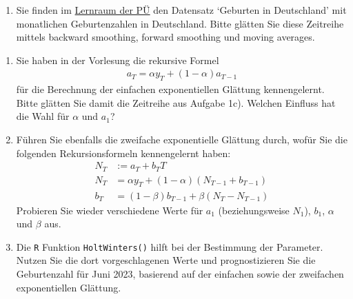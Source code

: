 \begin{enumerate}
\item Sie finden im \href{https://moodle.uni-bielefeld.de/course/view.php?id=1035}{Lernraum der PÜ} den Datensatz `Geburten in Deutschland' mit monatlichen Geburtenzahlen in Deutschland. Bitte glätten Sie diese Zeitreihe mittels backward smoothing, forward smoothing und moving averages.


\end{enumerate}


\begin{enumerate}

\item Sie haben in der Vorlesung die rekursive Formel 
\begin{align*}
    a_T = \alpha y_T + (1-\alpha) a_{T-1}
\end{align*}
für die Berechnung der einfachen exponentiellen Glättung kennengelernt. Bitte glätten Sie damit die Zeitreihe aus Aufgabe 1c). Welchen Einfluss hat die Wahl für $\alpha$ und $a_1$?


\item Führen Sie ebenfalls die zweifache exponentielle Glättung durch, wofür Sie die folgenden Rekursionsformeln kennengelernt haben:
\begin{align*}
    N_T &:= a_T + b_T T \\
    N_T &= \alpha y_T + (1-\alpha) (N_{T-1} + b_{T-1}) \\
    b_T &= (1 - \beta) b_{T-1} + \beta (N_T - N_{T-1})
\end{align*}
Probieren Sie wieder verschiedene Werte für $a_1$ (beziehungsweise $N_1$), $b_1$, $\alpha$ und $\beta$ aus.


\item Die \texttt{R} Funktion \texttt{HoltWinters()} hilft bei der Bestimmung der Parameter. Nutzen Sie die dort vorgeschlagenen Werte und prognostizieren Sie die Geburtenzahl für Juni 2023, basierend auf der einfachen sowie der zweifachen exponentiellen Glättung.


\end{enumerate}



